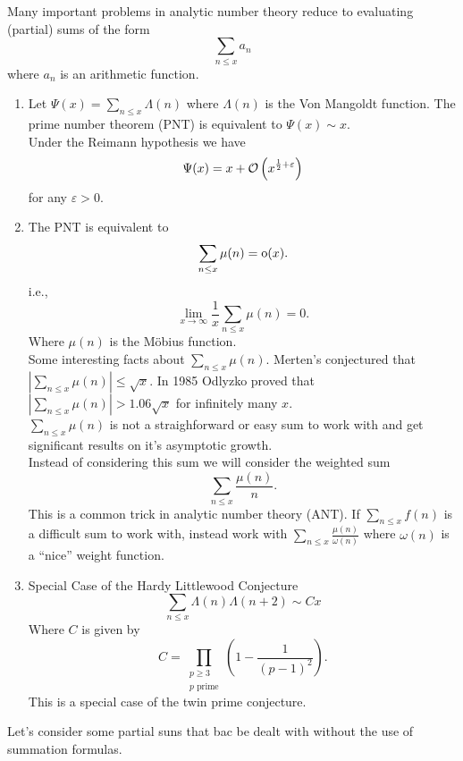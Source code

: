 \documentclass[twoside, openright, fontsize=10pt, headings=big]{scrbook}
\begin{document}
Many important problems in analytic number theory reduce to evaluating (partial) sums of the form
\[
    \sum_{n\leq x}a_n
\]
where $a_n$ is an arithmetic function.
\begin{example}{}{}
    \begin{enumerate}
        \item Let $\Psi(x)=\sum_{n\leq x}\Lambda(n)$ where $\Lambda(n)$ is the Von Mangoldt function. The prime number theorem (PNT) is equivalent to $\Psi(x)\sim x$.\\ Under the Reimann hypothesis we have
        \[
            \Psi(x)=x+\mathcal{O}\left(x^{\frac{1}{2}+\varepsilon}\right)
        \]
        for any $\varepsilon>0$.
        \item The PNT is equivalent to 
        \[
            \sum_{n\leq x}\mu(n)=\text{o}(x).
        \]
        i.e.,
        \[
            \lim_{x\to\infty}\frac{1}{x}\sum_{n\leq x}\mu(n)=0.
        \]
        Where $\mu(n)$ is the M\"{o}bius function.\\
        Some interesting facts about $\sum_{n\leq x}\mu(n)$. Merten's conjectured that $|\sum_{n\leq x}\mu(n)|\leq\sqrt{x}$. In 1985 Odlyzko proved that $|\sum_{n\leq x}\mu(n)|>1.06\sqrt{x}$ for infinitely many $x$.\\
        $\sum_{n\leq x}\mu(n)$ is not a straighforward or easy sum to work with and get significant results on it's asymptotic growth.\\
        Instead of considering this sum we will consider the weighted sum
        \[
        \sum_{n\leq x}\frac{\mu(n)}{n}.
        \]
        This is a common trick in analytic number theory (ANT). If $\sum_{n\leq x}f(n)$ is a difficult sum to work with, instead work with $\sum_{n\leq x}\frac{\mu(n)}{\omega(n)}$ where $\omega(n)$ is a ``nice'' weight function.
        \item Special Case of the Hardy Littlewood Conjecture
        \[
            \sum_{n\leq x}\Lambda(n)\Lambda(n+2)\sim Cx
        \]
        Where $C$ is given by \[C=\prod_{\substack{p\geq 3\\p\text{ prime}}}\left(1-\frac{1}{(p-1)^2}\right).\]
        This is a special case of the twin prime conjecture.
    \end{enumerate}
\end{example}
Let's consider some partial suns that bac be dealt with without the use of summation formulas.
\end{document}
